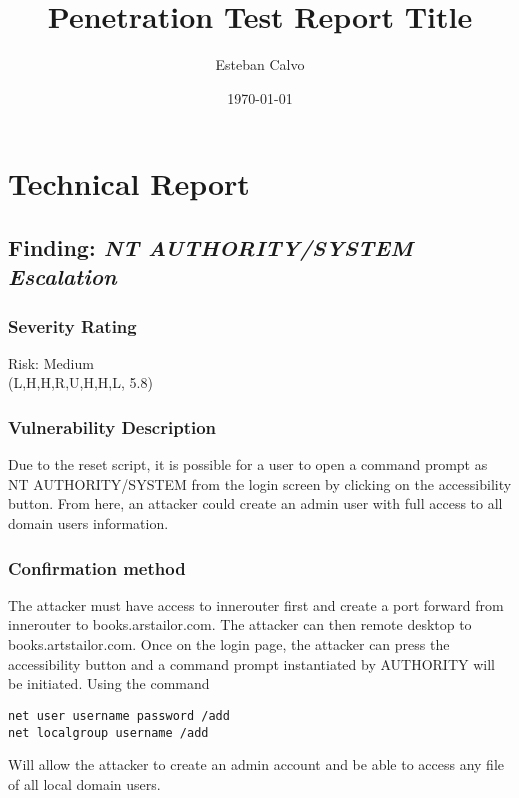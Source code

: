 \documentclass[notitlepage]{article}
\begin{document}
  
\title{Penetration Test Report Title}
\author{Esteban Calvo}
\date{\isodate\today}

\maketitle

\tableofcontents

\newpage
\section{Technical Report}

  \subsection{Finding: \emph{NT AUTHORITY/SYSTEM Escalation}}
  
	\subsubsection*{Severity Rating}
    Risk: Medium \\
    \cvss(L,H,H,R,U,H,H,L, 5.8)
		
  	\subsubsection*{Vulnerability Description}
  		Due to the reset script, it is possible for a user to open a command prompt as NT AUTHORITY/SYSTEM from the login screen
        by clicking on the accessibility button. From here, an attacker could create an admin user with full access to all domain users
        information.

  	\subsubsection*{Confirmation method}
  	The attacker must have access to innerouter first and create a port forward from innerouter to books.arstailor.com. The attacker can then remote
    desktop to books.artstailor.com. Once on the login page, the attacker can press the accessibility button and a command prompt instantiated by AUTHORITY
    will be initiated. Using the command
\begin{verbatim}
net user username password /add
net localgroup username /add
\end{verbatim}
    Will allow the attacker to create an admin account and be able to access any file of all local domain users.
\end{document}
